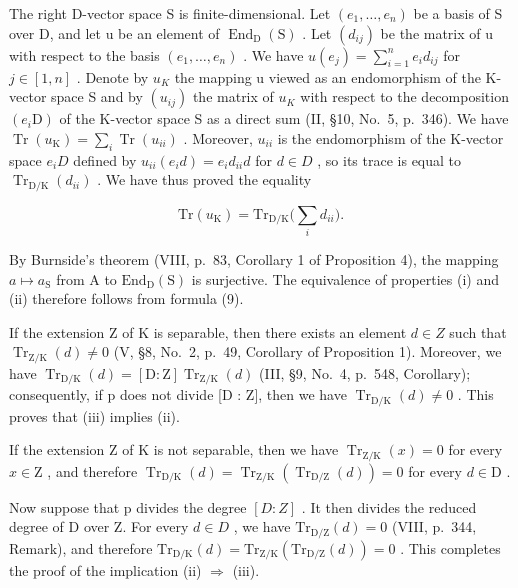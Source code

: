 The right D-vector space S is finite-dimensional. Let \((e_{1},\ldots,e_{n})\) be a basis of S over D, and let u be an element of \(\operatorname{End}_{\mathrm{D}}(\mathrm{S})\) . Let \((d_{ij})\) be the matrix of u with respect to the basis \((e_{1},\ldots,e_{n})\) . We have \(u(e_{j})=\sum_{i=1}^{n}e_{i}d_{ij}\) for \(j\in[1,n]\) . Denote by \(u_{K}\) the mapping u viewed as an endomorphism of the K-vector space S and by \((u_{ij})\) the matrix of \(u_{K}\) with respect to the decomposition \((e_{i}\mathrm{D})\) of the K-vector space S as a direct sum (II, §10, No.~5, p.~346). We have \(\operatorname{Tr}(u_{\mathrm{K}})=\sum_{i}\operatorname{Tr}(u_{ii})\) . Moreover, \(u_{ii}\) is the endomorphism of the K-vector space \(e_{i}D\) defined by \(u_{ii}(e_{i}d)=e_{i}d_{ii}d\) for \(d\in D\) , so its trace is equal to \(\operatorname{Tr}_{\mathrm{D}/\mathrm{K}}(d_{ii})\) . We have thus proved the equality

\[
\mathrm{Tr} (u _ {\mathrm{K}}) = \mathrm{Tr} _ {\mathrm{D/K}} \bigl (\sum_ {i} d _ {i i} \bigr).\tag{9}
\]

By Burnside's theorem (VIII, p.~83, Corollary 1 of Proposition 4), the mapping \(a \mapsto a_{\mathrm{S}}\) from A to \(\mathrm{End}_{\mathrm{D}}(\mathrm{S})\) is surjective. The equivalence of properties (i) and (ii) therefore follows from formula (9).

If the extension Z of K is separable, then there exists an element \(d \in Z\) such that \(\operatorname{Tr}_{\mathrm{Z/K}}(d) \neq 0\) (V, §8, No.~2, p.~49, Corollary of Proposition 1). Moreover, we have \(\operatorname{Tr}_{\mathrm{D/K}}(d) = [\mathrm{D} : \mathrm{Z}] \operatorname{Tr}_{\mathrm{Z/K}}(d)\) (III, §9, No.~4, p.~548, Corollary); consequently, if p does not divide {[}D : Z{]}, then we have \(\operatorname{Tr}_{\mathrm{D/K}}(d) \neq 0\) . This proves that (iii) implies (ii).

If the extension \(\mathrm{Z}\) of \(\mathrm{K}\) is not separable, then we have \(\operatorname{Tr}_{\mathrm{Z / K}}(x) = 0\) for every \(x \in \mathrm{Z}\) , and therefore \(\operatorname{Tr}_{\mathrm{D / K}}(d) = \operatorname{Tr}_{\mathrm{Z / K}}(\operatorname{Tr}_{\mathrm{D / Z}}(d)) = 0\) for every \(d \in \mathrm{D}\) .

Now suppose that p divides the degree \([D:Z]\) . It then divides the reduced degree of D over Z. For every \(d \in D\) , we have \(\mathrm{Tr}_{\mathrm{D}/\mathrm{Z}}(d) = 0\) (VIII, p.~344, Remark), and therefore \(\mathrm{Tr}_{\mathrm{D}/\mathrm{K}}(d) = \mathrm{Tr}_{\mathrm{Z}/\mathrm{K}}(\mathrm{Tr}_{\mathrm{D}/\mathrm{Z}}(d)) = 0\) . This completes the proof of the implication (ii) \(\Rightarrow\) (iii).

